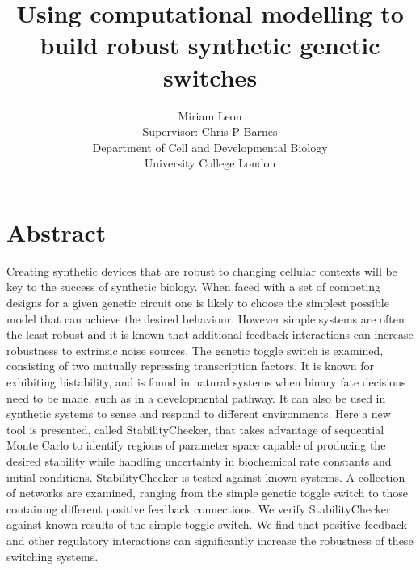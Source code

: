 \documentclass[11pt,a4paper, twoside, openright]{memoir}
\begin{document}
\title{Using computational modelling to build robust synthetic genetic switches}
\author{Miriam Leon \\ Supervisor: Chris P Barnes\\ Department of Cell and Developmental
 Biology \\ University College London}
\date{}
\maketitle



\newpage
\section{Abstract}
Creating synthetic devices that are robust to changing cellular contexts will be key to the success of 
synthetic biology. When faced with a set of competing designs for a given genetic circuit one is likely 
to choose the simplest possible model that can achieve the desired behaviour. However simple systems are 
often the least robust and it is known that additional feedback interactions can increase robustness to 
extrinsic noise sources. The genetic toggle switch is examined, consisting of two mutually repressing 
transcription factors. It is known for exhibiting bistability, and is found in natural systems when 
binary fate decisions need to be made, such as in a developmental pathway. It can also be used in 
synthetic systems to sense and respond to different environments.
\noindent
Here a new tool is presented, called StabilityChecker, that takes advantage of sequential Monte Carlo to 
identify regions of parameter space capable of producing the desired stability while handling uncertainty 
in biochemical rate constants and initial conditions. StabilityChecker is tested against known systems. A 
collection of networks are examined, ranging from the simple genetic toggle switch to those containing different 
positive feedback connections. 
\noindent
We verify StabilityChecker against known results of the simple toggle switch. We find that positive feedback 
and other regulatory interactions can significantly increase the robustness of these switching systems. 
\end{document}
